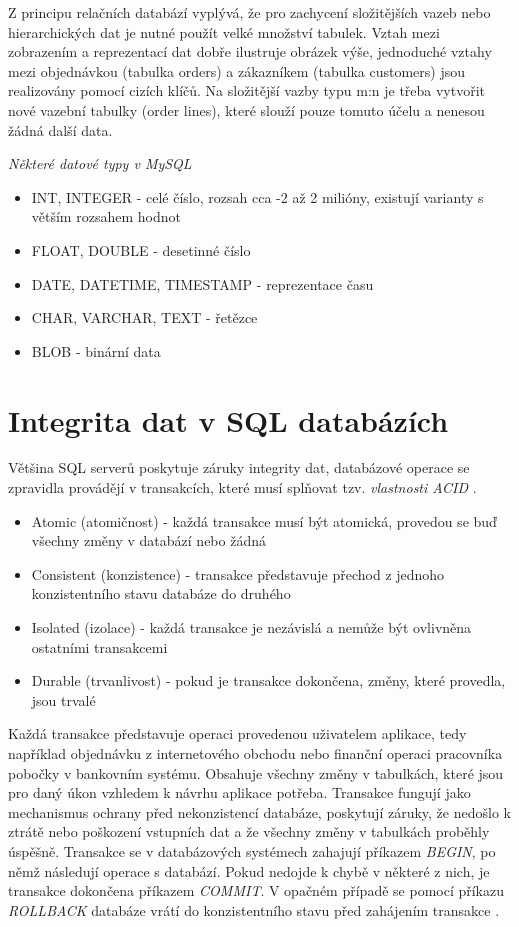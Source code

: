 Z principu relačních databází vyplývá, že pro zachycení složitějších vazeb nebo hierarchických dat je nutné použít velké množství tabulek. Vztah mezi zobrazením a reprezentací dat dobře ilustruje obrázek výše, jednoduché vztahy mezi objednávkou (tabulka orders) a zákazníkem (tabulka customers) jsou realizovány pomocí cizích klíčů. Na složitější vazby typu m:n je třeba vytvořit nové vazební tabulky (order lines), které slouží pouze tomuto účelu a nenesou žádná další data.

\vspace{0.5cm}
\noindent \emph{Některé datové typy v MySQL}
\begin{itemize}
\item INT, INTEGER - celé číslo, rozsah cca -2 až 2 milióny, existují varianty s větším rozsahem hodnot
\item FLOAT, DOUBLE - desetinné číslo
\item DATE, DATETIME, TIMESTAMP - reprezentace času
\item CHAR, VARCHAR, TEXT - řetězce
\item BLOB - binární data
\end{itemize}

\section{Integrita dat v SQL databázích}
Většina SQL serverů poskytuje záruky integrity dat, databázové operace se zpravidla provádějí v transakcích, které musí splňovat tzv. \emph{vlastnosti ACID} \cite{acid}.
\begin{itemize}
\item Atomic (atomičnost) - každá transakce musí být atomická, provedou se buď všechny změny v databází nebo žádná
\item Consistent (konzistence) - transakce představuje přechod z jednoho konzistentního stavu databáze do druhého
\item Isolated (izolace) - každá transakce je nezávislá a nemůže být ovlivněna ostatními transakcemi
\item Durable (trvanlivost) - pokud je transakce dokončena, změny, které provedla, jsou trvalé
\end{itemize}
Každá transakce představuje operaci provedenou uživatelem aplikace, tedy například objednávku z internetového obchodu nebo finanční operaci pracovníka pobočky v bankovním systému. Obsahuje všechny změny v tabulkách, které jsou pro daný úkon vzhledem k návrhu aplikace potřeba. Transakce fungují jako mechanismus ochrany před nekonzistencí databáze, poskytují záruky, že nedošlo k ztrátě nebo poškození vstupních dat a že všechny změny v tabulkách proběhly úspěšně. Transakce se v databázových systémech zahajují příkazem \emph{BEGIN}, po němž následují operace s databází. Pokud nedojde k chybě v některé z nich, je transakce dokončena příkazem \emph{COMMIT}. V opačném případě se pomocí příkazu \emph{ROLLBACK} databáze vrátí do konzistentního stavu před zahájením transakce \cite{transactions}.


